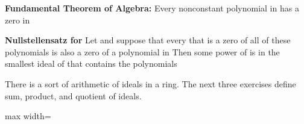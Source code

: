 \documentclass[11pt,oneside]{article}
\begin{document}
\begin{BookBody}

\textbf{Fundamental Theorem of Algebra:} Every nonconstant polynomial in  has a zero in 

\textbf{Nullstellensatz for}  Let  and suppose that every  that is a zero of all  of these polynomials is also a zero of a polynomial  in  Then some power of  is in the smallest ideal of  that contains the  polynomials 

\noindent There is a sort of arithmetic of ideals in a ring. The next three exercises define sum, product, and quotient of ideals.


\begin{center}\begin{adjustbox}{max width=\linewidth}\end{adjustbox}\end{center}



\end{BookBody}

\BookNarrativefalse
\end{document}
